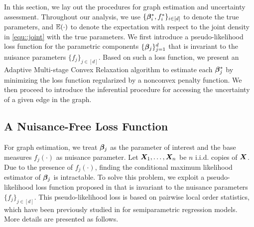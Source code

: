 \documentclass[twoside,11pt]{article}
\newcommand*{\bbetas}{\bbeta^*}
\begin{document}
 
In this section, we lay out the procedures for graph estimation and uncertainty assessment. Throughout our analysis, we use $\{\bbetas_i,f_i^* \}_{i\in[d]}$ to denote the true parameters, and $\mathbb{E}(\cdot)$ to denote the expectation with respect to the joint density in  \eqref{equ::joint} with the true parameters. We first introduce a pseudo-likelihood loss function for the parametric components  $\{\bm{\beta}_j\}_{j=1}^d$ that is invariant to the nuisance parameters  $\{ f_j \}_{j\in[d]}$.  Based on such a  loss function, we  present an Adaptive Multi-stage Convex Relaxation algorithm to  estimate each $\bbetas_j$ by  minimizing the  loss function regularized by a nonconvex penalty function. We then proceed to introduce the   inferential procedure  for accessing the uncertainty of a given edge in the graph.

\subsection{A Nuisance-Free Loss Function} 
For graph estimation, we treat $\bm{\beta}_j$ as the parameter of interest and the base measures $f_j(\cdot)$ as nuisance parameter. Let $\bm{X}_1,\ldots,\bm{X}_n$ be $n$ i.i.d. copies of $\bm{X}$.  Due to the presence of $f_j(\cdot)$,   finding the conditional maximum likelihood estimator of $\bm{\beta}_j$ is intractable. To  solve this problem, we exploit a pseudo-likelihood  loss function proposed in \cite{ning2014sparc} that is invariant to the nuisance parameters $ \{ f_j \}_{j\in[d]}$. This pseudo-likelihood loss is based on pairwise local order statistics, which have been previously studied in \cite{liang2000regression,diao2012maximum, chan2012nuisance} for semiparametric regression models. More details are presented as follows. 
\end{document}
